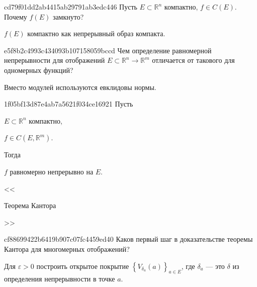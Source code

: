 \begin{note}{cd79f01dd2ab4415ab29791ab3edc446}
    Пусть \({ E \subset \mathbb R^{n} }\) компактно,\: \({ f \in C(E) }\).
    Почему \({ f(E) }\) замкнуто?

    \begin{cloze}{1}
        \({ f(E) }\) компактно как непрерывный образ компакта.
    \end{cloze}
\end{note}

\begin{note}{e5f8b2c4993c434093b107158059bccd}
    Чем определение равномерной непрерывности для отображений \({ E \subset \mathbb R^{n} \to \mathbb R^{m} }\) отличается от такового для одномерных функций?

    \begin{cloze}{1}
        Вместо модулей используются евклидовы нормы.
    \end{cloze}
\end{note}

\begin{note}{1f05bf13d87e4ab7a5621f034ce16921}
    Пусть \begin{icloze}{2}\({ E \subset \mathbb R^{n} }\) компактно,\end{icloze}\: \begin{icloze}{3}\({ f \in C(E, \mathbb R^{m}) }\).\end{icloze}
    Тогда \begin{icloze}{1}\({ f }\) равномерно непрерывно на \({ E }\).\end{icloze}

    \begin{center}
        \tiny
        <<\begin{icloze}{4}Теорема Кантора\end{icloze}>>
    \end{center}
\end{note}

\begin{note}{cf88699422b6419b907c07fc4459ed40}
    Каков первый шаг в доказательстве теоремы Кантора для многомерных отображений?

    \begin{cloze}{1}
        Для \({ \varepsilon > 0 }\) построить открытое покрытие \({ \left\{ V_{\delta_a}(a) \right\}_{a \in E} }\), где \({ \delta_a }\) --- это \({ \delta }\) из определения непрерывности в точке \({ a }\).
    \end{cloze}
\end{note}

